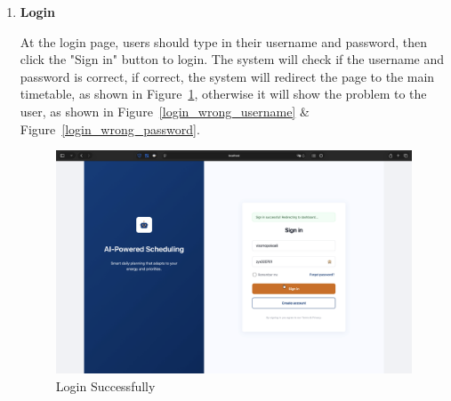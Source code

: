 \documentclass[12pt, a4paper]{article}
\begin{document}
            \begin{enumerate}
                \item \textbf{Login}
                
                    At the login page, users should type in their username and password, then click the "Sign in" button to login. The system will check if the username and password is correct, if correct, the system will redirect the page to the main timetable, as shown in Figure~\ref{login_correct}, otherwise it will show the problem to the user, as shown in Figure~\ref{login_wrong_username} \& Figure~\ref{login_wrong_password}. 
                    
                    \begin{figure}[H]
                        \centering
                        \includegraphics[width=\textwidth]{Images/System/login/redirect.png}
                        \caption{Login Successfully}
                        \label{login_correct}
                    \end{figure}
                    

\end{enumerate}
\end{document}
